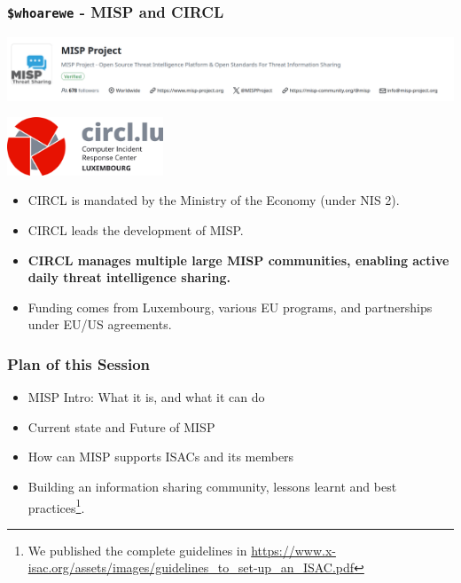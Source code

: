 
\begin{frame}[t,plain]
\titlepage
\end{frame}

\begin{frame}
    \frametitle{\texttt{\$whoarewe} - MISP and CIRCL}
    \begin{center}
        \includegraphics[width=1.0\textwidth]{misp-banner.png}
    \end{center}
    \begin{center}
        \includegraphics[width=0.35\textwidth]{circl.png}
    \end{center}
    \begin{itemize}
        \item CIRCL is mandated by the Ministry of the Economy (under NIS 2).
        \item CIRCL leads the development of MISP.
        \item {\bf CIRCL manages multiple large MISP communities, enabling active daily threat intelligence sharing.}
        \item Funding comes from Luxembourg, various EU programs, and partnerships under EU/US agreements.
    \end{itemize}
\end{frame}

\begin{frame}
    \frametitle{Plan of this Session}
    \begin{itemize}
        \item MISP Intro: What it is, and what it can do
        \item Current state and Future of MISP
        \item How can MISP supports ISACs and its members
    \end{itemize}
    \vspace{1em}
    \begin{itemize}
        \item Building an information sharing community, lessons learnt and best practices\footnote{We published the complete guidelines in \url{https://www.x-isac.org/assets/images/guidelines_to_set-up_an_ISAC.pdf}}.
    \end{itemize}
\end{frame}

